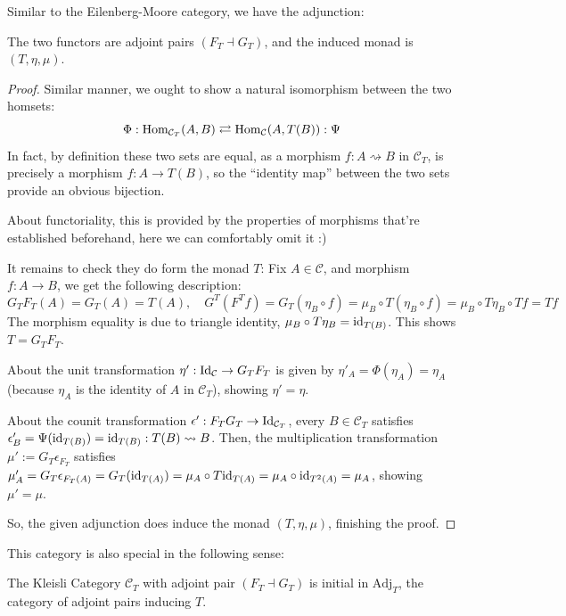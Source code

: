 \documentclass{article}
\begin{document}
Similar to the Eilenberg-Moore category, we have the adjunction:
\begin{thm}
The two functors are adjoint pairs $(F_T\dashv G_T)$, and the induced monad is $(T,\eta,\mu)$.
\end{thm}
\begin{proof}
    Similar manner, we ought to show a natural isomorphism between the two homsets:
    \[\Phi:\mathrm{Hom}_{\mathcal{C}_T}(A,B)\rightleftarrows \mathrm{Hom}_\mathcal{C}(A,T(B)):\Psi\]
    In fact, by definition these two sets are equal, as a morphism $f:A\rightsquigarrow B$ in $\mathcal{C}_T$, is precisely a morphism $f:A\rightarrow T(B)$, so the ``identity map'' between the two sets provide an obvious bijection.

    About functoriality, this is provided by the properties of morphisms that're established beforehand, here we can comfortably omit it :)

    \hfil

    It remains to check they do form the monad $T$: Fix $A\in\mathcal{C}$, and morphism $f:A\rightarrow B$, we get the following description:
    \[G_T F_T (A) = G_T (A) = T(A),\quad G^T(F^T f) = G_T (\eta_B\circ f) = \mu_B \circ T(\eta_B\circ f) = \mu_B\circ T\eta_B\circ Tf = Tf\]
    The morphism equality is due to triangle identity, $\mu_B\circ T\eta_B = \mathrm{id}_{T(B)}$. This shows $T = G_T F_T$.

    About the unit transformation $\eta':\mathrm{Id}_\mathcal{C}\rightarrow G_T F_T$ is given by $\eta'_A = \Phi(\eta_A) =\eta_A$ (because $\eta_A$ is the identity of $A$ in $\mathcal{C}_T$), showing $\eta'=\eta$.

    About the counit transformation $\epsilon':F_T G_T\rightarrow \mathrm{Id}_{\mathcal{C}_T}$, every $B\in\mathcal{C}_T$ satisfies $\epsilon'_B = \Psi(\mathrm{id}_{T(B)}) = \mathrm{id}_{T(B)}:T(B)\rightsquigarrow B$. Then, the multiplication transformation $\mu':=G_T \epsilon_{F_T}$ satisfies $\mu'_A = G_T \epsilon_{F_T (A)} = G_T(\mathrm{id}_{T(A)}) = \mu_A\circ T\mathrm{id}_{T(A)} = \mu_A\circ \mathrm{id}_{T^2(A)} = \mu_A$, showing $\mu' = \mu$.

    So, the given adjunction does induce the monad $(T,\eta,\mu)$, finishing the proof.
\end{proof}

\hfil

This category is also special in the following sense:
\begin{thm}
    The Kleisli Category $\mathcal{C}_T$ with adjoint pair $(F_T\dashv G_T)$ is initial in $\text{Adj}_T$, the category of adjoint pairs inducing $T$.
\end{thm}
\end{document}

